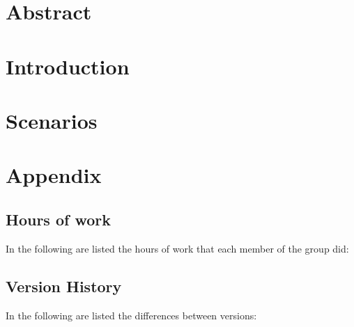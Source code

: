 \documentclass{../Common/Structure/doc_pdf}
\begin{document}
\titleToc

\chapter{Abstract}
\chapter{Introduction}
\chapter{Scenarios}




\appendix
\chapter{Appendix}

\section{Hours of work}
In the following are listed the hours of work that each member of the group did:
\newpage
\section{Version History}
In the following are listed the differences between versions:
\end{document}
